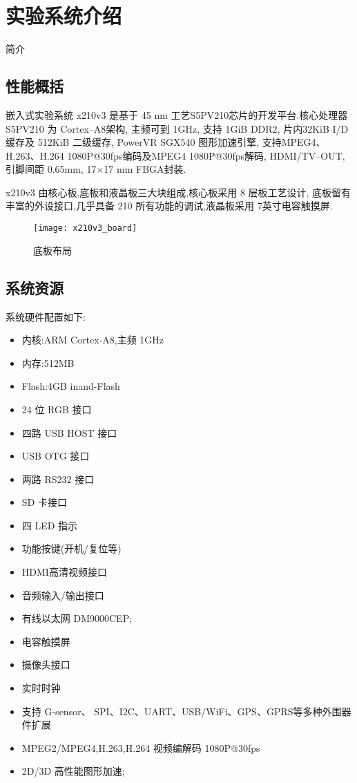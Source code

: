 \chapter{实验系统介绍}{简介}

\section{性能概括}

	嵌入式实验系统 x210v3 是基于 45 nm 工艺S5PV210芯片的开发平台.核心处理器
S5PV210 为 Cortex--A8架构, 主频可到 1GHz, 支持 1GiB DDR2, 片内32KiB I/D 缓存及
512KiB 二级缓存, PowerVR SGX540 图形加速引擎, 支持MPEG4、H.263、H.264 
1080P@30fps编码及MPEG4 1080P@30fps解码, HDMI/TV--OUT, 引脚间距 0.65mm, 
17$\times$17 mm FBGA封装.

	x210v3 由核心板,底板和液晶板三大块组成,核心板采用 8 层板工艺设计,  底板留有
丰富的外设接口,几乎具备 210 所有功能的调试,液晶板采用 7英寸电容触摸屏.

\begin{figure}
\centering
\texttt{[image: x210v3\_board]}
\caption{底板布局}
\end{figure}

\section{系统资源}

	系统硬件配置如下:

\begin{itemize}\itemsep=-3pt
  \item 内核:ARM Cortex-A8,主频 1GHz
  \item 内存:512MB
  \item Flash:4GB inand-Flash
  \item 24 位 RGB 接口
  \item 四路 USB HOST 接口
  \item USB OTG 接口
  \item 两路 RS232 接口
  \item SD 卡接口
  \item 四 LED 指示
  \item 功能按键(开机/复位等)
  \item HDMI高清视频接口
  \item 音频输入/输出接口
  \item 有线以太网 DM9000CEP;
  \item 电容触摸屏
  \item 摄像头接口
  \item 实时时钟
  \item 支持 G-sensor、 SPI、I2C、UART、USB/WiFi、GPS、GPRS等多种外围器件扩展
  \item MPEG2/MPEG4,H.263,H.264 视频编解码 1080P@30fps
  \item 2D/3D 高性能图形加速;
\end{itemize}

